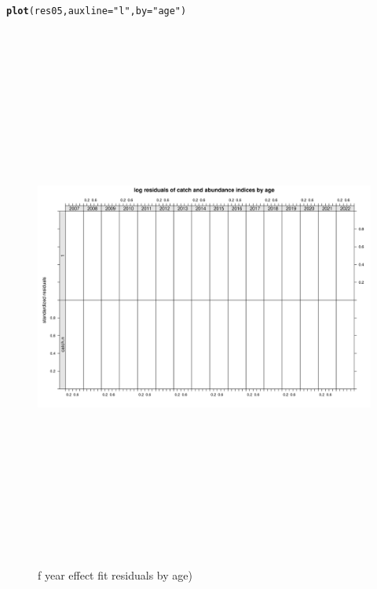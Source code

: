 \documentclass[a4paper,english,11pt]{article}\usepackage[]{graphicx}\usepackage[]{xcolor}
\makeatletter
\newcommand{\hlsng}[1]{\textcolor[rgb]{0.192,0.494,0.8}{#1}}%
\newcommand{\hldef}[1]{\textcolor[rgb]{0.345,0.345,0.345}{#1}}%
\newcommand{\hlkwc}[1]{\textcolor[rgb]{0.333,0.667,0.333}{#1}}%
\newcommand{\hlkwd}[1]{\textcolor[rgb]{0.737,0.353,0.396}{\textbf{#1}}}%
\newenvironment{kframe}{%
 \def\at@end@of@kframe{}%
 \ifinner\ifhmode%
  \def\at@end@of@kframe{\end{minipage}}%
  \begin{minipage}{\columnwidth}%
 \fi\fi%
 \def\FrameCommand##1{\hskip\@totalleftmargin \hskip-\fboxsep
 \colorbox{shadecolor}{##1}\hskip-\fboxsep
     \hskip-\linewidth \hskip-\@totalleftmargin \hskip\columnwidth}%
 \MakeFramed {\advance\hsize-\width
   \@totalleftmargin\z@ \linewidth\hsize
   \@setminipage}}%
 {\par\unskip\endMakeFramed%
 \at@end@of@kframe}
\newenvironment{knitrout}{}{} %
\makeatother
\begin{document}
\begin{knitrout}
\color{fgcolor}\begin{kframe}
\begin{alltt}
\hlkwd{plot}\hldef{(res05,} \hlkwc{auxline} \hldef{=} \hlsng{"l"}\hldef{,} \hlkwc{by} \hldef{=} \hlsng{"age"}\hldef{)}
\end{alltt}
\end{kframe}\begin{figure}[H]

{\centering \includegraphics[width=25cm,height=18cm,angle=90]{figure/fyearresbyage-1} 

}

\caption[f year effect fit residuals by age)]{f year effect fit residuals by age)}\label{fig:fyearresbyage}
\end{figure}

\end{knitrout}
\end{document}

